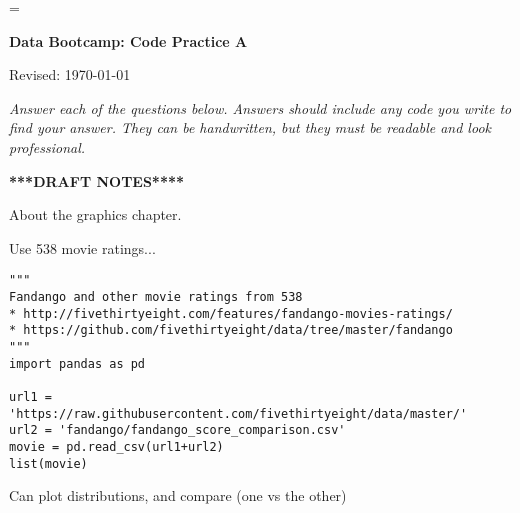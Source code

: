 \documentclass[11pt]{exam}
\begin{document}
\parskip=\bigskipamount
\parindent=0.0in
\thispagestyle{empty}


\bigskip\bigskip
\centerline{\Large \bf Data Bootcamp:  Code Practice A}
\centerline{Revised: \today}

{\it Answer each of the questions below.
Answers should include any code you write to find your answer.
They can be handwritten, but they must be readable and look professional.}


\bigskip
\centerline{\bf ****DRAFT NOTES****}


\begin{questions}
\item About the graphics chapter.


\item Use 538 movie ratings...
\begin{verbatim}
"""
Fandango and other movie ratings from 538
* http://fivethirtyeight.com/features/fandango-movies-ratings/
* https://github.com/fivethirtyeight/data/tree/master/fandango
"""
import pandas as pd

url1 = 'https://raw.githubusercontent.com/fivethirtyeight/data/master/'
url2 = 'fandango/fandango_score_comparison.csv'
movie = pd.read_csv(url1+url2)
list(movie)
\end{verbatim}

Can plot distributions, and compare (one vs the other)


\end{questions}


\end{document}
